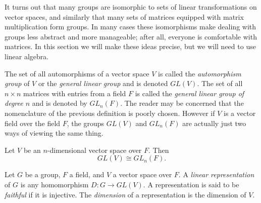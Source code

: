 It turns out that many groups are isomorphic to sets of linear transformations
on vector spaces, and similarly that many sets of matrices equipped with matrix
multiplication form groups. In many cases these isomorphisms make dealing with
groups less abstract and more manageable; after all, everyone is comfortable
with matrices. In this section we will make these ideas precise, but we will
need to use linear algebra. 

The set of all automorphisms of a vector space $V$ is called
the {\it automorphism group} of $V$ or the 
{\it general linear group} and is
denoted $GL(V)$. The set of all $n\times n$ matrices with entries from 
a field $F$ is called the {\it general linear group of degree $n$} and 
is denoted by $GL_{n}(F)$.
The reader may be concerned that the nomenclature
of the previous definition is poorly chosen. However if $V$ is a vector field
over the field $F$, the groups $GL(V)$ and $GL_{n}(F)$ are actually just two
ways of viewing the same thing. 

\begin{theorem}{}{}
  Let $V$ be an $n$-dimensional vector space over $F$. Then 
  $$GL(V)\cong GL_{n}(F).$$
\end{theorem}

Let $G$ be a group, $F$ a field, and $V$ a vector space over
$F$. A {\it linear representation} of $G$ 
is any homomorphism $D:G\to GL(V)$. A representation is said to be 
{\it faithful} if it is injective. 
The {\it dimension} of a representation 
is the dimension of $V$.


